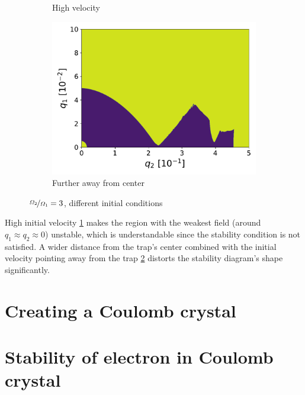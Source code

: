 \begin{figure}[H]
\begin{subfigure}{.3\textwidth}
  \caption{High velocity}
  \label{fig:high_velocity-3}
\end{subfigure}%
\begin{subfigure}{.3\textwidth}
  \centering
  \includegraphics[width=\linewidth]{img/0_ions_1_electrons_q1_0.0-0.1_q2_0.0-0.5_960x960_3.pdf}  
  \caption{Further away from center}
  \label{fig:large_radius-3}
\end{subfigure}
\caption{$\nicefrac{\Omega_2}{\Omega_1} = 3$, different initial conditions}
\label{fig:init-conds-eta=3}
\end{figure}

High initial velocity \ref{fig:high_velocity-3} makes the region with the weakest field (around $q_1 \approx q_2 \approx 0$) unstable, which is understandable since the stability condition  is not satisfied. A wider distance from the trap's center combined with the initial velocity pointing away from the trap \ref{fig:large_radius-3} distorts the stability diagram's shape significantly. 


\section{Creating a Coulomb crystal}

\section{Stability of electron in Coulomb crystal}
